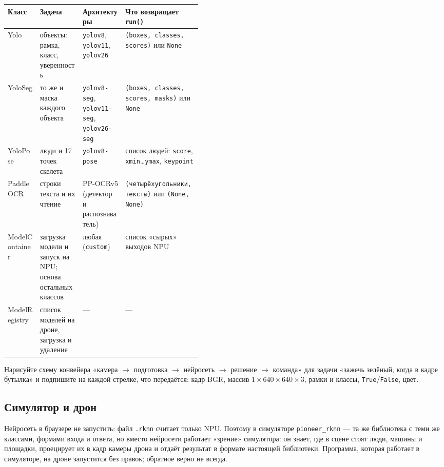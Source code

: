 \begin{center}
\small
\begin{tabularx}{\linewidth}{@{}>{\ttfamily}l >{\raggedright\arraybackslash}p{0.22\linewidth} >{\raggedright\arraybackslash}p{0.22\linewidth} >{\raggedright\arraybackslash}X@{}}
\toprule
\textrm{\textbf{Класс}} & \textbf{Задача} & \textbf{Архитектуры} & \textbf{Что возвращает \texttt{run()}} \\
\midrule
Yolo & объекты: рамка, класс, уверенность & \texttt{yolov8}, \texttt{yolov11}, \texttt{yolov26} & \texttt{(boxes, classes, scores)} или \texttt{None} \\
YoloSeg & то же и маска каждого объекта & \texttt{yolov8-seg}, \texttt{yolov11-seg}, \texttt{yolov26-seg} & \texttt{(boxes, classes, scores, masks)} или \texttt{None} \\
YoloPose & люди и 17 точек скелета & \texttt{yolov8-pose} & список людей: \texttt{score}, \texttt{xmin}\ldots\texttt{ymax}, \texttt{keypoint} \\
PaddleOCR & строки текста и их чтение & PP-OCRv5 (детектор и распознаватель) & \texttt{(четырёхугольники, тексты)} или \texttt{(None, None)} \\
ModelContainer & загрузка модели и запуск на NPU; основа остальных классов & любая (\texttt{custom}) & список «сырых» выходов NPU \\
ModelRegistry & список моделей на дроне, загрузка и удаление & --- & --- \\
\bottomrule
\end{tabularx}
\end{center}

\begin{taskbox}
Нарисуйте схему конвейера «камера $\to$ подготовка $\to$ нейросеть $\to$ решение $\to$ команда» для задачи «зажечь зелёный, когда в кадре бутылка» и подпишите на каждой стрелке, что передаётся: кадр BGR, массив $1\times640\times640\times3$, рамки и классы, \texttt{True}/\texttt{False}, цвет.
\end{taskbox}

\subsection{Симулятор и дрон}

Нейросеть в браузере не запустить: файл \texttt{.rknn} считает только NPU. Поэтому в симуляторе \texttt{pioneer\_rknn} --- та же библиотека с теми же классами, формами входа и ответа, но вместо нейросети работает «зрение» симулятора: он знает, где в сцене стоят люди, машины и площадки, проецирует их в кадр камеры дрона и отдаёт результат в формате настоящей библиотеки. Программа, которая работает в симуляторе, на дроне запустится без правок; обратное верно не всегда.

